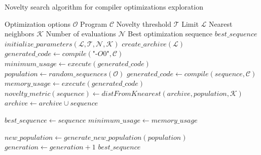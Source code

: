 \begin{algorithm}
  \footnotesize
	\caption{Novelty search algorithm for compiler optimizations exploration}
	\label{algo:search}
	\begin{algorithmic}[1]
	
		\REQUIRE Optimization options $\mathcal{O}$
		\REQUIRE Program $\mathcal{C}$
		\REQUIRE Novelty threshold $\mathcal{T}$
		\REQUIRE Limit $\mathcal{L}$
		\REQUIRE Nearest neighbors $\mathcal{K}$
		\REQUIRE Number of evaluations $\mathcal{N}$
		\ENSURE Best optimization sequence $best\_sequence$
		\STATE $initialize\_parameters(\mathcal{L},\mathcal{T},\mathcal{N},\mathcal{K})$
		\STATE $create\_archive(\mathcal{L})$
		\STATE 	$generated\_code \gets compile(\textit{"-O0"},\mathcal{C})$
		\STATE 	$minimum\_usage \gets execute(generated\_code)$
		\STATE $population \gets random\_sequences(\mathcal{O})$
		\REPEAT
		\STATE 	$generated\_code \gets compile(sequence,\mathcal{C})$
		\STATE 	$memory\_usage \gets execute(generated\_code)$
		\STATE	$novelty\_metric(sequence) \gets distFromKnearest(archive,population,\mathcal{K})$
		\STATE	$archive \gets archive \cup sequence$
		\ENDIF
		
			\STATE	$best\_sequence \gets sequence$
			\STATE	$minimum\_usage \gets memory\_usage$
			\ENDIF
			
		\ENDFOR
		\STATE		$new\_population \gets generate\_new\_population(population)$
		\STATE		$generation \gets generation + 1$
		\RETURN $best\_sequence$
	\end{algorithmic}
\end{algorithm}


